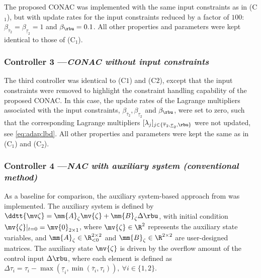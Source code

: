 \documentclass[letterpaper, journal]{IEEEtran}
\begin{document}
The proposed CONAC was implemented with the same input constraints as in (C$_1$), but with update rates for the input constraints reduced by a factor of $100$: $\beta_{\overline{\tau}_2}=\beta_{\underline{\tau}_2}=1$ and $\beta_{\rbu}=0.1$.
All other properties and parameters were kept identical to those of (C$_1$).

\subsubsection*{Controller 3 —\textit{CONAC without input constraints}}

The third controller was identical to (C$1$) and (C$2$), except that the input constraints were removed to highlight the constraint handling capability of the proposed CONAC.
In this case, the update rates of the Lagrange multipliers associated with the input constraints, \ie $\beta_{\overline{\tau}_2},\beta_{\underline{\tau}_2}$ and $\beta_{\rbu}$, were set to zero, such that the corresponding Lagrange multipliers $[\lambda_j]_{j\in\{\overline{\tau}_2,\underline{\tau}_2,\rbu\}}$ were not updated, see \eqref{eq:adap:lbd}.
All other properties and parameters were kept the same as in (C$_1$) and (C$_2$).

\subsubsection*{Controller 4 —\textit{NAC with auxiliary system (conventional method)}}

As a baseline for comparison, the auxiliary system-based approach from \cite{Esfandiari:2014aa, Karason:1994aa, Esfandiari:2015aa} was implemented.
The auxiliary system is defined by $\ddtt{\mv\zeta} = \mm{A}_\zeta \mv{\zeta} + \mm{B}_\zeta \Delta\rbu$, with initial condition $\mv{\zeta}\vert_{t=0} = \mv{0}_{2\times1}$, where $\mv{\zeta}\in\R^2$ represents the auxiliary state variables, and $\mm{A}_\zeta\in\R_{<0}^{2\times 2}$ and $\mm{B}_\zeta\in\R^{2\times 2}$ are user-designed matrices.
The auxiliary state $\mv{\zeta}$ is driven by the overflow amount of the control input $\Delta\rbu$, where each element is defined as $\Delta\tau_{i} = \tau_{i}-\max(\underline\tau_i,\min(\overline\tau_i,\tau_i)),\ \forall i\in\{1,2\}$.
\end{document}
